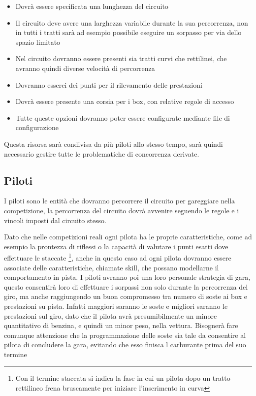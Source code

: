 \documentclass[a4paper,11pt, twoside]{book}
\begin{document}
        \begin{itemize}
          \item Dovrà essere specificata una lunghezza del circuito
          \item Il circuito deve avere una larghezza variabile durante la sua percorrenza, non in tutti i tratti sarà
                ad esempio possibile eseguire un sorpasso per via dello spazio limitato
          \item Nel circuito dovranno essere presenti sia tratti curvi che rettilinei, che avranno quindi diverse velocità
                di percorrenza
          \item Dovranno esserci dei punti per il rilevamento delle prestazioni
          \item Dovrà essere presente una corsia per i box, con relative regole di accesso
	  \item Tutte queste opzioni dovranno poter essere configurate mediante file di configurazione
        \end{itemize}
        
        Questa risorsa sarà condivisa da più piloti allo stesso tempo, sarà quindi necessario gestire
        tutte le problematiche di concorrenza derivate.
        
        
        
        
      
      \subsection{Piloti}
        I piloti sono le entità che dovranno percorrere il circuito per gareggiare nella competizione,
        la percorrenza del circuito dovrà avvenire seguendo le regole e i vincoli imposti dal circuito
        stesso.
        
        Dato che nelle competizioni reali ogni pilota ha le proprie caratteristiche, come ad esempio la prontezza di riflessi
        o la capacità di valutare i punti esatti dove effettuare le staccate \footnote{Con il termine staccata si indica 
        la fase in cui un pilota dopo un tratto rettilineo frena bruscamente per iniziare l'inserimento in curva},
        anche in questo caso ad ogni pilota dovranno essere associate delle caratteristiche, chiamate skill, che possano
        modellarne il comportamento in pista.
        I piloti avranno poi una loro personale strategia di gara, questo consentirà loro di effettuare
        i sorpassi non solo durante la percorrenza del giro, ma anche raggiungendo un buon compromesso
        tra numero di soste ai box e prestazioni su pista. Infatti maggiori saranno le soste e migliori saranno le prestazioni
        sul giro, dato che il pilota avrà presumibilmente un minore quantitativo di benzina, e quindi un minor peso, nella vettura.
        Bisognerà fare comunque attenzione che la programmazione delle soste sia tale da consentire al pilota di concludere la gara,
        evitando che esso finisca l carburante prima del suo termine
        
\end{document}
